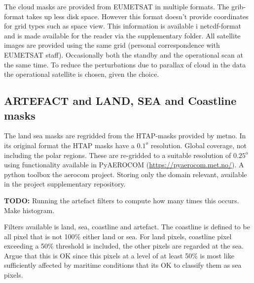 

The cloud masks are provided from EUMETSAT in multiple formats. The grib-format takes up less disk space. However this format doesn't provide coordinates for grid types such as space view. This information is available i \acrshort{netcdf}-format and is made available for the reader via the supplementary folder. All satellite images are provided using the same grid (personal correspondence with EUMETSAT staff). Occasionally both the standby and the operational scan at the same time. To reduce the perturbations due to parallax of cloud in the data the operational satellite is chosen, given the choice.

\subsection{ARTEFACT and LAND, SEA and Coastline masks} \label{sec:artefact}
The land sea masks are regridded from the HTAP-masks provided by \acrfull{metno}.  In its original format the HTAP masks have a $0.1^o$ resolution. Global coverage, not including the polar regions. These are re-gridded to a suitable resolution of $0.25^o$ using functionality available in PyAEROCOM (\href{https://pyaerocom.met.no/}{https://pyaerocom.met.no/}). A python toolbox the \acrfull{aerocom} project. Storing only the domain relevant, available in the project supplementary repository. 

\textbf{TODO:} Running the artefact filters to compute how many times this occurs. Make histogram.

Filters available is land, sea, coastline and artefact. The coastline is defined to be all pixel that is not 100\% either land or sea. For land pixels, coastline pixel exceeding a 50\% threshold is included, the other pixels are regarded at the sea. Argue that this is OK since this pixels at a level of at least 50\% is most like sufficiently affected by maritime conditions that its OK to classify them as sea pixels.

